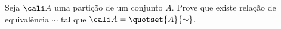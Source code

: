 \begin{exercise}
    Seja $\cali A$ uma partição de um conjunto $A$. Prove que existe relação de equivalência $\sim$ tal que $\cali A = \quotset{A}{\sim}$.
\end{exercise}
